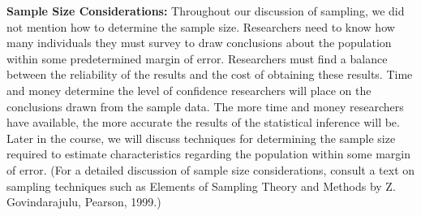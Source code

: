 \documentclass{report}
\begin{document}
        \bigbreak \noindent 
        \textbf{Sample Size Considerations:}
        \bigbreak \noindent 
        Throughout our discussion of sampling, we did not mention how to determine the sample size. Researchers need to know how many individuals they must survey to draw conclusions about the population within some predetermined margin of error.
        \bigbreak \noindent 
        Researchers must find a balance between the reliability of the results and the cost of obtaining these results. Time and money determine the level of confidence researchers will place on the conclusions drawn from the sample data. The more time and money researchers have available, the more accurate the results of the statistical inference will be.
        \bigbreak \noindent 
        Later in the course, we will discuss techniques for determining the sample size required to estimate characteristics regarding the population within some margin of error. (For a detailed discussion of sample size considerations, consult a text on sampling techniques such as Elements of Sampling Theory and Methods by Z. Govindarajulu, Pearson, 1999.)

        \pagebreak \bigbreak \noindent
\end{document}
